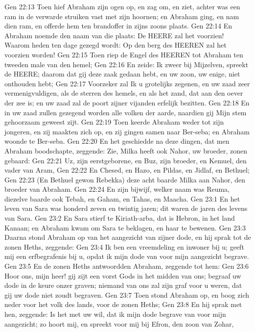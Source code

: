 Gen 22:13  Toen hief Abraham zijn ogen op, en zag om, en ziet, achter was een ram in de verwarde struiken vast met zijn hoornen; en Abraham ging, en nam dien ram, en offerde hem ten brandoffer in zijns zoons plaats.
Gen 22:14  En Abraham noemde den naam van die plaats: De HEERE zal het voorzien! Waarom heden ten dage gezegd wordt: Op den berg des HEEREN zal het voorzien worden!
Gen 22:15  Toen riep de Engel des HEEREN tot Abraham ten tweeden male van den hemel;
Gen 22:16  En zeide: Ik zweer bij Mijzelven, spreekt de HEERE; daarom dat gij deze zaak gedaan hebt, en uw zoon, uw enige, niet onthouden hebt;
Gen 22:17  Voorzeker zal Ik u grotelijks zegenen, en uw zaad zeer vermenigvuldigen, als de sterren des hemels, en als het zand, dat aan den oever der zee is; en uw zaad zal de poort zijner vijanden erfelijk bezitten.
Gen 22:18  En in uw zaad zullen gezegend worden alle volken der aarde, naardien gij Mijn stem gehoorzaam geweest zijt.
Gen 22:19  Toen keerde Abraham weder tot zijn jongeren, en zij maakten zich op, en zij gingen samen naar Ber-seba; en Abraham woonde te Ber-seba.
Gen 22:20  En het geschiedde na deze dingen, dat men Abraham boodschapte, zeggende: Zie, Milka heeft ook Nahor, uw broeder, zonen gebaard:
Gen 22:21  Uz, zijn eerstgeborene, en Buz, zijn broeder, en Kemuel, den vader van Aram,
Gen 22:22  En Chesed, en Hazo, en Pildas, en Jidlaf, en Bethuel;
Gen 22:23  (En Bethuel gewon Rebekka) deze acht baarde Milka aan Nahor, den broeder van Abraham.
Gen 22:24  En zijn bijwijf, welker naam was Reuma, diezelve baarde ook Tebah, en Gaham, en Tahas, en Maacha.
Gen 23:1  En het leven van Sara was honderd zeven en twintig jaren; dit waren de jaren des levens van Sara.
Gen 23:2  En Sara stierf te Kiriath-arba, dat is Hebron, in het land Kanaan; en Abraham kwam om Sara te beklagen, en haar te bewenen.
Gen 23:3  Daarna stond Abraham op van het aangezicht van zijner dode, en hij sprak tot de zonen Heths, zeggende:
Gen 23:4  Ik ben een vreemdeling en inwoner bij u; geeft mij een erfbegrafenis bij u, opdat ik mijn dode van voor mijn aangezicht begrave.
Gen 23:5  En de zonen Heths antwoordden Abraham, zeggende tot hem:
Gen 23:6  Hoor ons, mijn heer! gij zijt een vorst Gods in het midden van ons; begraaf uw dode in de keure onzer graven; niemand van ons zal zijn graf voor u weren, dat gij uw dode niet zoudt begraven.
Gen 23:7  Toen stond Abraham op, en boog zich neder voor het volk des lands, voor de zonen Heths;
Gen 23:8  En hij sprak met hen, zeggende: Is het met uw wil, dat ik mijn dode begrave van voor mijn aangezicht; zo hoort mij, en spreekt voor mij bij Efron, den zoon van Zohar,
